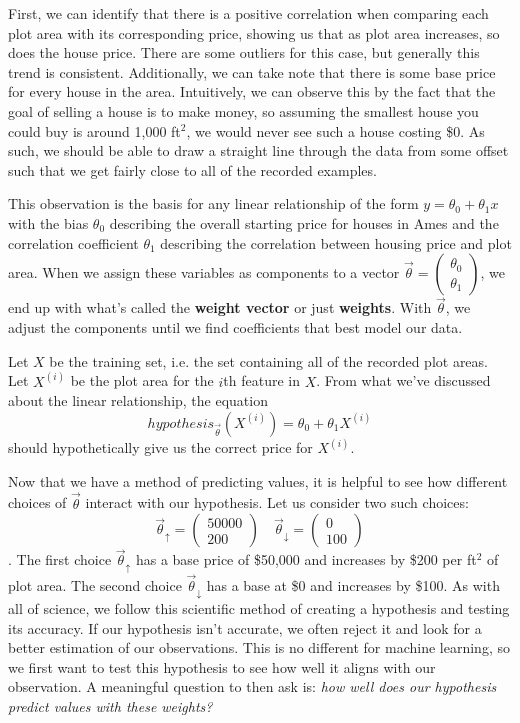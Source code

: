 First, we can identify that there is a positive correlation when comparing each
plot area with its corresponding price, showing us that as plot area increases,
so does the house price. There are some outliers for this case, but generally
this trend is consistent. Additionally, we can take note that there is some
base price for every house in the area. Intuitively, we can
observe this by the fact that the goal of selling a house is to make money, so
assuming the smallest house you could buy is around 1,000 ft$^2$, we would
never see such a house costing \$0. As such, we should be able to draw a
straight line through the data from some offset such that we get fairly close
to all of the recorded examples.

This observation is the basis for any linear relationship of the form
$y=\theta_0 + \theta_1x$ with the bias $\theta_0$ describing the overall
starting price for houses in Ames and the correlation coefficient $\theta_1$
describing the correlation between housing price and plot area. When we assign
these variables as components to a vector $\vec\theta = \begin{pmatrix}\theta_0
\\ \theta_1\end{pmatrix}$, we end up with what's called the  \textbf{weight
vector} or just \textbf{weights}. With $\vec\theta$, we adjust the components
until we find coefficients that best model our data. 

Let $X$ be the training set, i.e. the set containing all of the
recorded plot areas. Let $X^{(i)}$ be the plot area for the $i$th feature in
$X$. From what we've discussed about the linear relationship, the equation
\begin{equation}
    hypothesis_{\vec\theta}(X^{(i)}) = \theta_0 + \theta_1X^{(i)}
\end{equation}
should hypothetically give us the correct price for $X^{(i)}$.

Now that we have a method of predicting values, it is helpful to see how
different choices of $\vec\theta$ interact with our hypothesis. Let us consider
two such choices:
\begin{equation*}
	\vec\theta_{\uparrow} = \begin{pmatrix}50000 \\ 200\end{pmatrix} \quad 	\vec\theta_{\downarrow} = \begin{pmatrix}0 \\ 100\end{pmatrix}
\end{equation*}
. The first choice $\vec\theta_{\uparrow}$ has a base price of \$50,000 and increases by \$200 per ft$^2$ of plot area. The second choice $\vec\theta_{\downarrow}$ has a base at \$0 and increases by \$100. As with all of science, we follow this scientific method of creating a hypothesis and testing its accuracy. If our hypothesis isn't accurate, we often reject it and look for a better estimation of our observations. This is no different for machine learning, so we first want to test this hypothesis to see how well it aligns with our observation. A meaningful question to then ask is: \emph{how well does our hypothesis predict values with these weights?}

